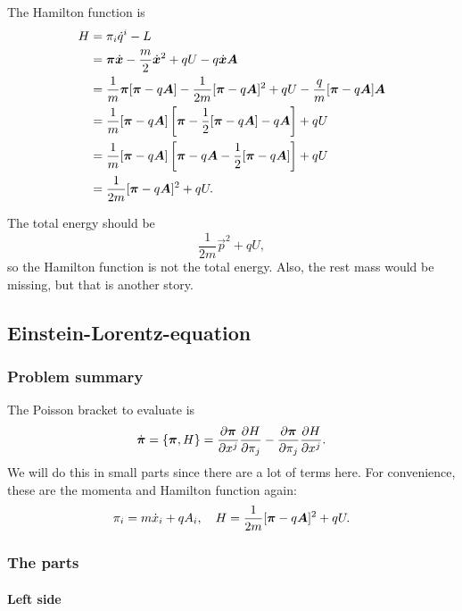 \documentclass[11pt, english, fleqn, DIV=15, headinclude, BCOR=1cm]{scrartcl}
\begin{document}
The Hamilton function is
\begin{align*}
    H
    &= \pi_i \dot q^i - L \\
    &= \boldsymbol{\pi} \dot{\boldsymbol{x}} - \frac m2 \dot{\boldsymbol{x}}^2 + qU - q \dot{\boldsymbol{x}}
    \boldsymbol{A} \\
    &= \frac 1m \boldsymbol{\pi} [\boldsymbol{\pi} - q \boldsymbol{A}] - \frac1{2m} [\boldsymbol{\pi} - q \boldsymbol{A}]^2 + qU -
    \frac qm [\boldsymbol{\pi} - q \boldsymbol{A}] \boldsymbol{A} \\
    &= \frac 1m [\boldsymbol{\pi} - q \boldsymbol{A}] \left[ \boldsymbol{\pi} - \frac12 [\boldsymbol{\pi} - q \boldsymbol{A}] -
    q \boldsymbol{A} \right] + qU \\
    &= \frac 1m [\boldsymbol{\pi} - q \boldsymbol{A}] \left[ \boldsymbol{\pi} -
    q \boldsymbol{A} - \frac12 [\boldsymbol{\pi} - q \boldsymbol{A}] \right] + qU \\
    &= \frac 1{2m} [\boldsymbol{\pi} - q \boldsymbol{A}]^2 + qU.
\end{align*}

The total energy should be
\[
    \frac{1}{2m} \vec p^2 + qU,
\]
so the Hamilton function is not the total energy. Also, the rest mass would be
missing, but that is another story.

\subsection{Einstein-Lorentz-equation}

\subsubsection{Problem summary}

The Poisson bracket to evaluate is
\begin{equation}
    \label{eq:1-3-bracket}
    \dot{\boldsymbol{\pi}} = \{\boldsymbol{\pi}, H\} = \frac{\partial {\boldsymbol{\pi}}}{\partial {x^j}} \frac{\partial {H}}{\partial {\pi_j}} -
    \frac{\partial {\boldsymbol{\pi}}}{\partial {\pi_j}} \frac{\partial {H}}{\partial {x^j}}.
\end{equation}
We will do this in small parts since there are a lot of terms here. For
convenience, these are the momenta and Hamilton function again:
\[
    \pi_i = m \dot x_i + q A_i
    ,\quad
    H = \frac 1{2m} [\boldsymbol{\pi} - q \boldsymbol{A}]^2 + qU.
\]

\subsubsection{The parts}

\paragraph{Left side}
\end{document}
